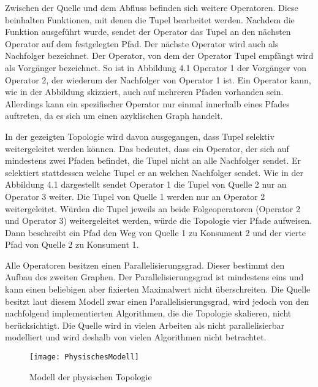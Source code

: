 Zwischen der Quelle und dem Abfluss befinden sich weitere Operatoren. 
Diese beinhalten Funktionen, mit denen die Tupel bearbeitet werden.
Nachdem die Funktion ausgeführt wurde, sendet der Operator das Tupel an den nächsten Operator auf dem festgelegten Pfad.
Der nächste Operator wird auch als Nachfolger bezeichnet.
Der Operator, von dem der Operator Tupel empfängt wird als Vorgänger bezeichnet.
So ist in Abbildung 4.1 Operator 1 der Vorgänger von Operator 2, der wiederum der Nachfolger von Operator 1 ist.
Ein Operator kann, wie in der Abbildung skizziert, auch auf mehreren Pfaden vorhanden sein. 
Allerdings kann ein spezifischer Operator nur einmal innerhalb eines Pfades auftreten, da es sich um einen azyklischen Graph handelt.

In der gezeigten Topologie wird davon ausgegangen, dass Tupel selektiv weitergeleitet werden können.
Das bedeutet, dass ein Operator, der sich auf mindestens zwei Pfaden befindet, die Tupel nicht an alle Nachfolger sendet.
Er selektiert stattdessen welche Tupel er an welchen Nachfolger sendet.
Wie in der Abbildung 4.1 dargestellt sendet Operator 1 die Tupel von Quelle 2 nur an Operator 3 weiter.
Die Tupel von Quelle 1 werden nur an Operator 2 weitergeleitet.
Würden die Tupel jeweils an beide Folgeoperatoren (Operator 2 und Operator 3) weitergeleitet werden, würde die Topologie vier Pfade aufweisen.
Dann beschreibt ein Pfad den Weg von Quelle 1 zu Konsument 2 und der vierte Pfad von Quelle 2 zu Konsument 1.

Alle Operatoren besitzen einen Parallelisierungsgrad.
Dieser bestimmt den Aufbau des zweiten Graphen. 
Der Parallelisierungsgrad ist mindestens eins und kann einen beliebigen aber fixierten Maximalwert nicht überschreiten. 
Die Quelle besitzt laut diesem Modell zwar einen Parallelisierungsgrad, wird jedoch von den nachfolgend implementierten Algorithmen, die die Topologie skalieren, nicht berücksichtigt.
Die Quelle wird in vielen Arbeiten als nicht parallelisierbar modelliert und wird deshalb von vielen Algorithmen nicht betrachtet.

\begin{figure}
\texttt{[image: PhysischesModell]}
\caption{Modell der physischen Topologie}
\end{figure}

